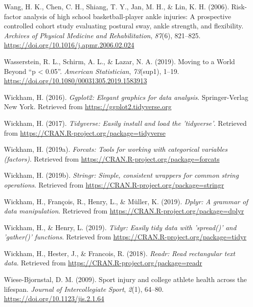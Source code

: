 \documentclass[
  english,
  man,floatsintext]{apa6}
\begin{document}
\leavevmode\hypertarget{ref-Wang2006}{}%
Wang, H. K., Chen, C. H., Shiang, T. Y., Jan, M. H., \& Lin, K. H. (2006). Risk-factor analysis of high school basketball-player ankle injuries: A prospective controlled cohort study evaluating postural sway, ankle strength, and flexibility. \emph{Archives of Physical Medicine and Rehabilitation}, \emph{87}(6), 821--825. \url{https://doi.org/10.1016/j.apmr.2006.02.024}

\leavevmode\hypertarget{ref-Wasserstein2019}{}%
Wasserstein, R. L., Schirm, A. L., \& Lazar, N. A. (2019). Moving to a World Beyond ``p \textless{} 0.05''. \emph{American Statistician}, \emph{73}(sup1), 1--19. \url{https://doi.org/10.1080/00031305.2019.1583913}

\leavevmode\hypertarget{ref-R-ggplot2}{}%
Wickham, H. (2016). \emph{Ggplot2: Elegant graphics for data analysis}. Springer-Verlag New York. Retrieved from \url{https://ggplot2.tidyverse.org}

\leavevmode\hypertarget{ref-R-tidyverse}{}%
Wickham, H. (2017). \emph{Tidyverse: Easily install and load the 'tidyverse'}. Retrieved from \url{https://CRAN.R-project.org/package=tidyverse}

\leavevmode\hypertarget{ref-R-forcats}{}%
Wickham, H. (2019a). \emph{Forcats: Tools for working with categorical variables (factors)}. Retrieved from \url{https://CRAN.R-project.org/package=forcats}

\leavevmode\hypertarget{ref-R-stringr}{}%
Wickham, H. (2019b). \emph{Stringr: Simple, consistent wrappers for common string operations}. Retrieved from \url{https://CRAN.R-project.org/package=stringr}

\leavevmode\hypertarget{ref-R-dplyr}{}%
Wickham, H., François, R., Henry, L., \& Müller, K. (2019). \emph{Dplyr: A grammar of data manipulation}. Retrieved from \url{https://CRAN.R-project.org/package=dplyr}

\leavevmode\hypertarget{ref-R-tidyr}{}%
Wickham, H., \& Henry, L. (2019). \emph{Tidyr: Easily tidy data with 'spread()' and 'gather()' functions}. Retrieved from \url{https://CRAN.R-project.org/package=tidyr}

\leavevmode\hypertarget{ref-R-readr}{}%
Wickham, H., Hester, J., \& Francois, R. (2018). \emph{Readr: Read rectangular text data}. Retrieved from \url{https://CRAN.R-project.org/package=readr}

\leavevmode\hypertarget{ref-Wiese-Bjornstal2009}{}%
Wiese-Bjornstal, D. M. (2009). Sport injury and college athlete health across the lifespan. \emph{Journal of Intercollegiate Sport}, \emph{2}(1), 64--80. \url{https://doi.org/10.1123/jis.2.1.64}
\end{document}
